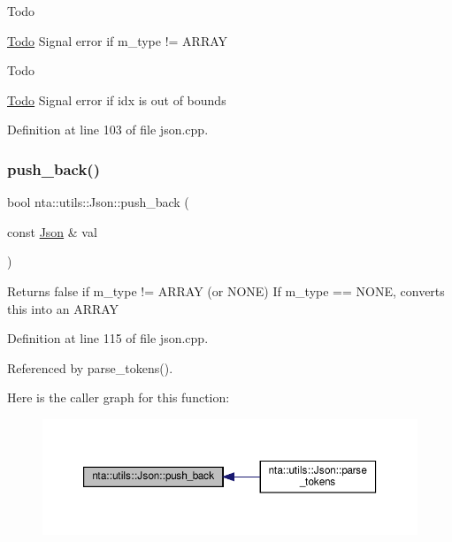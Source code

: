 \begin{DoxyRefDesc}{Todo}
\item[\hyperlink{todo__todo000022}{Todo}]Signal error if m\+\_\+type != A\+R\+R\+AY \end{DoxyRefDesc}
\begin{DoxyRefDesc}{Todo}
\item[\hyperlink{todo__todo000023}{Todo}]Signal error if idx is out of bounds \end{DoxyRefDesc}


Definition at line 103 of file json.\+cpp.

\mbox{\label{classnta_1_1utils_1_1Json_a2015e471fd47c1a077ca752c9b1fabbd}} 
\subsubsection{\texorpdfstring{push\+\_\+back()}{push\_back()}}
{\footnotesize\ttfamily bool nta\+::utils\+::\+Json\+::push\+\_\+back (\begin{DoxyParamCaption}\item[{const \hyperlink{classnta_1_1utils_1_1Json}{Json} \&}]{val }\end{DoxyParamCaption})}

Returns false if m\+\_\+type != A\+R\+R\+AY (or N\+O\+NE) If m\+\_\+type == N\+O\+NE, converts this into an A\+R\+R\+AY 

Definition at line 115 of file json.\+cpp.



Referenced by parse\+\_\+tokens().

Here is the caller graph for this function\+:\nopagebreak
\begin{figure}[H]
\begin{center}
\leavevmode
\includegraphics[width=350pt]{d1/d3d/classnta_1_1utils_1_1Json_a2015e471fd47c1a077ca752c9b1fabbd_icgraph}
\end{center}
\end{figure}
\mbox{\label{classnta_1_1utils_1_1Json_a905d67b125a7aadd771bb74a1bb63f34}} 
